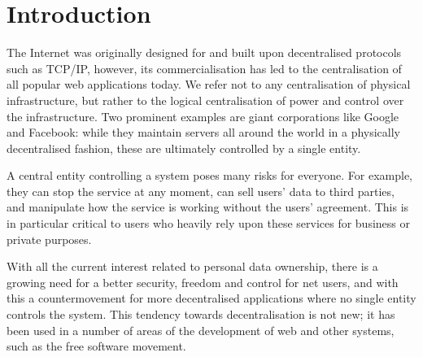 \section{Introduction}\label{sec:intro}
The Internet was originally designed for and built upon decentralised protocols such as TCP/IP, however, its commercialisation has led to the centralisation of all popular web applications today. We refer not to any centralisation of physical infrastructure, but rather to the logical centralisation of power and control over the infrastructure. Two prominent examples are giant corporations like Google and Facebook: while they maintain servers all around the world in a physically decentralised fashion, these are ultimately controlled by a single entity.

A central entity controlling a system poses many risks for everyone. For example, they can stop the service at any moment, can sell users' data to third parties, and manipulate how the service is working without the users' agreement. This is in particular critical to users who heavily rely upon these services for business or private purposes.

With all the current interest related to personal data ownership, there is a growing need for a better security, freedom and control for net users, and with this a countermovement for more decentralised applications where no single entity controls the system. This tendency towards decentralisation is not new; it has been used in a number of areas of the development of web and other systems, such as the free software movement. %

